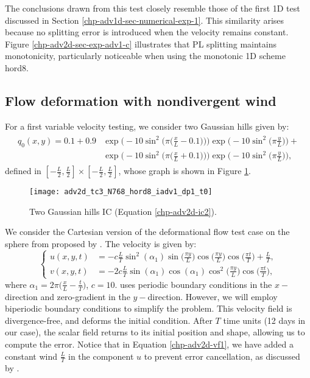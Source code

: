 The conclusions drawn from this test closely resemble those of the first 1D test discussed in Section \ref{chp-adv1d-sec-numerical-exp-1}.
This similarity arises because no splitting error is introduced when the velocity remains constant.
Figure \ref{chp-adv2d-sec-exp-adv1-c} illustrates that PL splitting maintains monotonicity, particularly noticeable when using the monotonic 1D scheme hord8.

\subsection{Flow deformation with nondivergent wind}
\label{2d-adv-ndivflow}
For a first variable velocity testing, we consider two Gaussian hills given by:
\begin{align}
	\begin{split}
	\label{chp-adv2d-ic2}
	q_0(x,y) = 0.1 + 0.9&\exp\bigg(-10\sin^2 \bigg(\pi \bigg(\frac{x}{L}-0.1\bigg)\bigg)\bigg) \exp\bigg(-10\sin^2 \bigg(\pi \frac{y}{L}\bigg) \bigg)+ \\
	           &\exp\bigg(-10\sin^2 \bigg(\pi \bigg(\frac{x}{L}+0.1\bigg)\bigg)\bigg) \exp\bigg(-10\sin^2 \bigg(\pi \frac{y}{L}\bigg) \bigg),
	\end{split}
\end{align}
defined in $[-\frac{L}{2},\frac{L}{2}] \times [-\frac{L}{2},\frac{L}{2}]$, whose graph is shown in Figure \ref{chp-adv2d-sec-exp-adv2-ic}.
\begin{figure}[!htb]
	\centering
	\texttt{[image: adv2d\_tc3\_N768\_hord8\_iadv1\_dp1\_t0]}
	\caption{Two Gaussian hills IC (Equation \eqref{chp-adv2d-ic2}). \label{chp-adv2d-sec-exp-adv2-ic}}
\end{figure}

We consider the Cartesian version of the deformational flow test case on the sphere from \citet{nair:2010}
proposed by \citet{chen:2017}. The velocity is given by:
\begin{equation}
	\label{chp-adv2d-vf1}
	\begin{cases}
		u(x,y,t) &= -c\frac{L}{T} \sin^2(\alpha_1)\sin\big(\frac{\pi y}{L}\big)\cos\big(\frac{\pi y}{L}\big)  \cos\big(\frac{\pi t}{T}\big) + \frac{L}{T},\\
		v(x,y,t) &= -2c\frac{L}{T}\sin(\alpha_1)  \cos(\alpha_1)\cos^2\big(\frac{\pi y}{L}\big)\cos\big(\frac{\pi t}{T}\big),
	\end{cases}
\end{equation}
where $\alpha_1 = 2\pi\big(\frac{x}{L}-\frac{t}{T}\big)$, $c = 10$.
\citet{chen:2017} uses periodic boundary conditions in the $x-$direction and zero-gradient in the $y-$direction.
However, we will employ biperiodic boundary conditions to simplify the problem.
This velocity field is divergence-free, and deforms the initial condition.
After $T$ time units (12 days in our case), the scalar field returns to its initial position and shape, allowing us to compute the error.
Notice that in Equation \eqref{chp-adv2d-vf1}, we have added a constant wind $\frac{L}{T}$ in the component
$u$ to prevent error cancellation, as discussed by \citet{nair:2010}.

